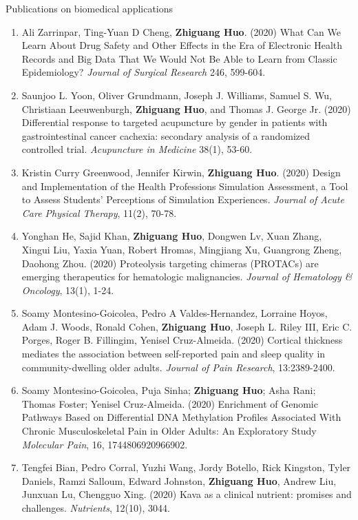 \documentclass{resume} %
\begin{document}
\begin{rSection}{Publications on biomedical applications}
\begin{enumerate}[noitemsep,topsep=0pt, resume]
\item
Ali Zarrinpar,  Ting-Yuan D Cheng, {\bf Zhiguang Huo}. (2020)
What Can We Learn About Drug Safety and Other Effects in the Era of Electronic Health Records and Big Data That We Would Not Be Able to Learn from Classic Epidemiology?
\emph{Journal of Surgical Research} 246, 599-604.

\item 
Saunjoo L. Yoon, Oliver Grundmann, Joseph J. Williams, Samuel S. Wu, Christiaan Leeuwenburgh, {\bf Zhiguang Huo}, and Thomas J. George Jr. (2020)
Differential response to targeted acupuncture by gender in patients with gastrointestinal cancer cachexia: secondary analysis of a randomized controlled trial.
\emph{Acupuncture in Medicine}  38(1), 53-60.

\item
Kristin Curry Greenwood,  Jennifer Kirwin, {\bf Zhiguang Huo}. (2020)
Design and Implementation of the Health Professions Simulation Assessment, a Tool to Assess Students' Perceptions of Simulation Experiences. \emph{Journal of Acute Care Physical Therapy}, 11(2), 70-78.


 
\item
Yonghan He, Sajid Khan, {\bf Zhiguang Huo}, Dongwen Lv, Xuan Zhang, Xingui Liu, Yaxia Yuan, Robert Hromas, Mingjiang Xu, Guangrong Zheng, Daohong Zhou. (2020)
Proteolysis targeting chimeras (PROTACs) are emerging therapeutics for hematologic malignancies.
\emph{Journal of Hematology \& Oncology}, 13(1), 1-24.

\item  
Soamy Montesino-Goicolea, Pedro A Valdes-Hernandez,  Lorraine Hoyos, Adam J. Woods, Ronald Cohen,  {\bf Zhiguang Huo}, Joseph L. Riley III, Eric C. Porges, Roger B. Fillingim, Yenisel Cruz-Almeida. (2020)
Cortical thickness mediates the association between self-reported pain and sleep quality in community-dwelling older adults. 
\emph{Journal of Pain Research}, 13:2389-2400.


\item
Soamy Montesino-Goicolea, Puja Sinha; {\bf Zhiguang Huo}; Asha Rani; Thomas Foster; Yenisel Cruz-Almeida. (2020)
Enrichment of Genomic Pathways Based on Differential DNA Methylation Profiles Associated With Chronic Musculoskeletal Pain in Older Adults: An Exploratory Study
\emph{Molecular Pain}, 16, 1744806920966902.

\item  
Tengfei Bian, Pedro Corral, Yuzhi Wang, Jordy Botello, Rick Kingston, Tyler Daniels, Ramzi Salloum, Edward Johnston, {\bf Zhiguang Huo}, Andrew Liu,  Junxuan Lu, Chengguo Xing. (2020)
Kava as a clinical nutrient: promises and challenges.
\emph{Nutrients}, 12(10), 3044.





\end{enumerate}
\end{rSection}
\end{document}
